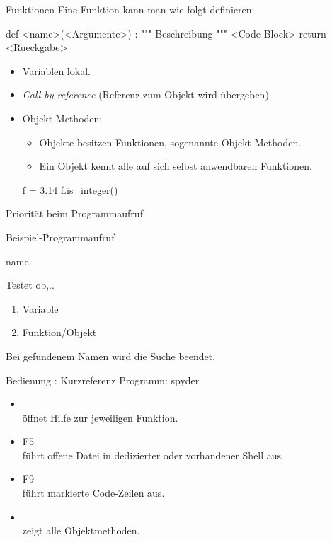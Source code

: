 \documentclass[hyperref={xetex}]{beamer}
\begin{document}
\begin{frame}[fragile]{Funktionen}
Eine Funktion kann man wie folgt definieren:
\begin{pyin}
def <name>(<Argumente>) : 
    """ Beschreibung """
    <Code Block>
    return <Rueckgabe>
\end{pyin}
\begin{itemize}
\item Variablen lokal.
\item \textsl{Call-by-reference} (Referenz zum Objekt wird übergeben)
\item \alert{Objekt-Methoden}:\\
  \begin{itemize}
    \item Objekte besitzen Funktionen, sogenannte Objekt-Methoden.
\item Ein Objekt kennt alle auf sich selbst anwendbaren Funktionen.
  \end{itemize}

\begin{pyin}
f = 3.14
f.is_integer()
\end{pyin}
\end{itemize}

\end{frame}


\begin{frame}[fragile]{Priorität beim Programmaufruf}

Beispiel-Programmaufruf
\begin{pyin}
name
\end{pyin}

Testet ob,..
\begin{enumerate}
\item  \alert{Variable}
\item  \alert{Funktion/Objekt} 
\end{enumerate}
Bei gefundenem Namen wird die Suche beendet.
\end{frame}


\begin{frame}{Bedienung : Kurzreferenz}
  Programm:  spyder 
\begin{itemize}
\item \alert{ }\\ öffnet Hilfe zur jeweiligen Funktion.
\item \alert{F5}\\ führt offene Datei in dedizierter oder vorhandener Shell aus.
\item \alert{F9}\\ führt markierte Code-Zeilen aus.
\item \alert{} \\ zeigt alle Objektmethoden.
\end{itemize}
\end{frame}
\end{document}

